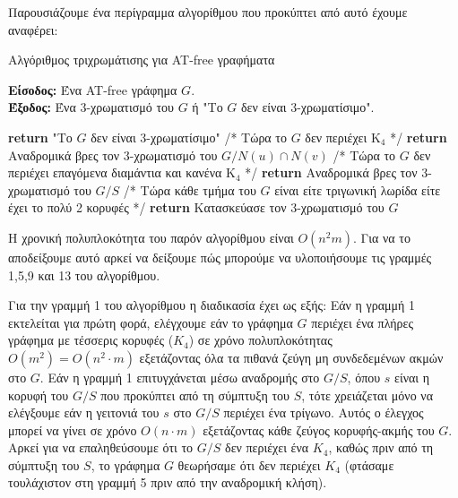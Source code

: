 Παρουσιάζουμε ένα περίγραμμα αλγορίθμου που προκύπτει από αυτό έχουμε αναφέρει:
\begin{algorithm}[H]
	\caption{Αλγόριθμος τριχρωμάτισης για AT-free γραφήματα}
	\label{alg:coloring}
	
	\hspace*{\algorithmicindent} \textbf{Είσοδος:} Ένα AT-free γράφημα $G$.\\
	
	\hspace*{\algorithmicindent} \textbf{Έξοδος:} Ένα 3-χρωματισμό του $G$ ή "Το $G$ δεν είναι 3-χρωματίσιμο".
	
	\begin{algorithmic}[1]
		
		\STATE \textbf{return} "Το $G$ δεν είναι 3-χρωματίσιμο"
		\ENDIF
		\STATE /* Τώρα το $G$ δεν περιέχει $\text{Κ}_{\text{4}}$ */
		\STATE \textbf{return} Αναδρομικά βρες τον 3-χρωματισμό του $G/N(u) \cap N(v)$
		\ENDIF
		\STATE /* Τώρα το $G$ δεν περιέχει επαγόμενα διαμάντια και κανένα $\text{Κ}_{\text{4}}$ */
		\STATE \textbf{return} Αναδρομικά βρες τον 3-χρωματισμό του $G/S$
		\ENDIF
		\STATE /* Τώρα κάθε τμήμα του $G$ είναι είτε τριγωνική λωρίδα είτε έχει το πολύ 2 κορυφές */
		\STATE \textbf{return} Κατασκεύασε τον 3-χρωματισμό του $G$
	\end{algorithmic}
\end{algorithm}

Η χρονική πολυπλοκότητα του παρόν αλγορίθμου είναι $O(n^2m)$. Για να το αποδείξουμε αυτό αρκεί να δείξουμε πώς μπορούμε να υλοποιήσουμε τις γραμμές 1,5,9 και 13 του αλγορίθμου.

Για την γραμμή 1 του αλγορίθμου η διαδικασία έχει ως εξής: Εάν η γραμμή 1 εκτελείται για πρώτη φορά, ελέγχουμε εάν το γράφημα $G$ περιέχει ένα πλήρες γράφημα με τέσσερις κορυφές ($K_4$) σε χρόνο πολυπλοκότητας $O(m^2) = O(n^2 \cdot m)$ εξετάζοντας όλα τα πιθανά ζεύγη μη συνδεδεμένων ακμών στο $G$. Εάν η γραμμή 1 επιτυγχάνεται μέσω αναδρομής στο $G/S$, όπου $s$ είναι η κορυφή του $G/S$ που προκύπτει από τη σύμπτυξη του $S$, τότε χρειάζεται μόνο να ελέγξουμε εάν η γειτονιά του $s$ στο $G/S$ περιέχει ένα τρίγωνο. Αυτός ο έλεγχος μπορεί να γίνει σε χρόνο $O(n \cdot m)$ εξετάζοντας κάθε ζεύγος κορυφής-ακμής του $G$. Αρκεί για να επαληθεύσουμε ότι το $G/S$ δεν περιέχει ένα $K_4$, καθώς πριν από τη σύμπτυξη του $S$, το γράφημα $G$ θεωρήσαμε ότι δεν περιέχει $K_4$ (φτάσαμε τουλάχιστον στη γραμμή 5 πριν από την αναδρομική κλήση).

